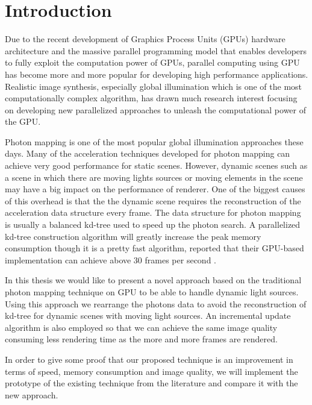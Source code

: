 \chapter{Introduction}

Due to the recent development of Graphics Process Units (GPUs) hardware architecture and the massive parallel programming model that enables developers to fully exploit the computation power of GPUs, parallel computing using GPU has become more and more popular for developing high performance applications. Realistic image synthesis, especially global illumination which is one of the most computationally complex algorithm, has drawn much research interest focusing on developing new parallelized approaches to unleash the computational power of the GPU. 

Photon mapping is one of the most popular global illumination approaches these days. Many of the acceleration techniques developed for photon mapping can achieve very good performance for static scenes. However, dynamic scenes such as a scene in which there are moving lights sources or moving elements in the scene may have a big impact on the performance of renderer. One of the biggest causes of this overhead is that the the dynamic scene requires the reconstruction of the acceleration data structure every frame. The data structure for photon mapping is usually a balanced kd-tree \cite{Bentley:1975:MBS:361002.361007} used to speed up the photon search. A parallelized kd-tree construction algorithm will greatly increase the peak memory consumption though it is a pretty fast algorithm, \citeauthor{Zhou2008} reported that their GPU-based implementation can achieve above 30 frames per second \cite{Zhou2008}. 


In this thesis we would like to present a novel approach based on the traditional photon mapping technique on GPU to be able to handle dynamic light sources. Using this approach we rearrange the photons data to avoid the reconstruction of kd-tree for dynamic scenes with moving light sources. An incremental update algorithm is also employed so that we can achieve the same image quality consuming less rendering time as the more and more frames are rendered. 

In order to give some proof that our proposed technique is an improvement in terms of speed, memory consumption and image quality, we will implement the prototype of the existing technique from the literature and compare it with the new approach.

